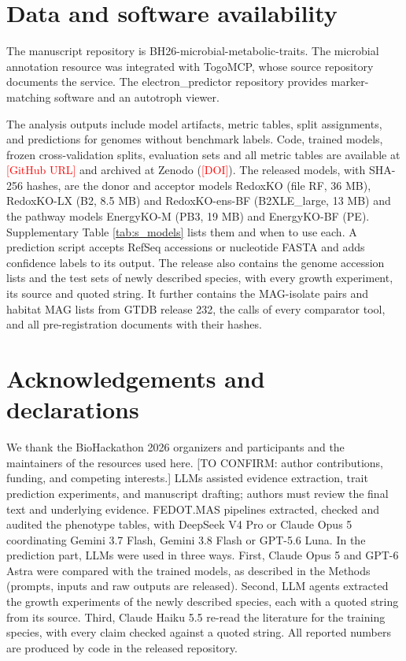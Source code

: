 \documentclass[10pt,a4paper,onecolumn]{article}
\begin{document}
\section{Data and software
availability}\label{data-and-software-availability}

The manuscript repository is BH26-microbial-metabolic-traits. The
microbial annotation resource was integrated with TogoMCP, whose source
repository documents the service. The electron\_predictor repository
provides marker-matching software and an autotroph viewer.

The analysis outputs include model artifacts, metric tables, split
assignments, and predictions for genomes without benchmark labels. Code,
trained models, frozen cross-validation splits, evaluation sets and all
metric tables are available at \textcolor{red}{[GitHub URL]} and
archived at Zenodo (\textcolor{red}{[DOI]}). The released models, with
SHA-256 hashes, are the donor and acceptor models RedoxKO (file RF, 36
MB), RedoxKO-LX (B2, 8.5 MB) and RedoxKO-ens-BF (B2XLE\_large, 13 MB)
and the pathway models EnergyKO-M (PB3, 19 MB) and EnergyKO-BF (PE).
Supplementary Table \ref{tab:s_models} lists them and when to use each.
A prediction script accepts RefSeq accessions or nucleotide FASTA and
adds confidence labels to its output. The release also contains the
genome accession lists and the test sets of newly described species,
with every growth experiment, its source and quoted string. It further
contains the MAG-isolate pairs and habitat MAG lists from GTDB release
232, the calls of every comparator tool, and all pre-registration
documents with their hashes.

\section{Acknowledgements and
declarations}\label{acknowledgements-and-declarations}

We thank the BioHackathon 2026 organizers and participants and the
maintainers of the resources used here. {[}TO CONFIRM: author
contributions, funding, and competing interests.{]} LLMs assisted
evidence extraction, trait prediction experiments, and manuscript
drafting; authors must review the final text and underlying evidence.
FEDOT.MAS pipelines extracted, checked and audited the phenotype tables,
with DeepSeek V4 Pro or Claude Opus 5 coordinating Gemini 3.7 Flash,
Gemini 3.8 Flash or GPT-5.6 Luna. In the prediction part, LLMs were used
in three ways. First, Claude Opus 5 and GPT-6 Astra were compared with
the trained models, as described in the Methods (prompts, inputs and raw
outputs are released). Second, LLM agents extracted the growth
experiments of the newly described species, each with a quoted string
from its source. Third, Claude Haiku 5.5 re-read the literature for the
training species, with every claim checked against a quoted string. All
reported numbers are produced by code in the released repository.
\end{document}
